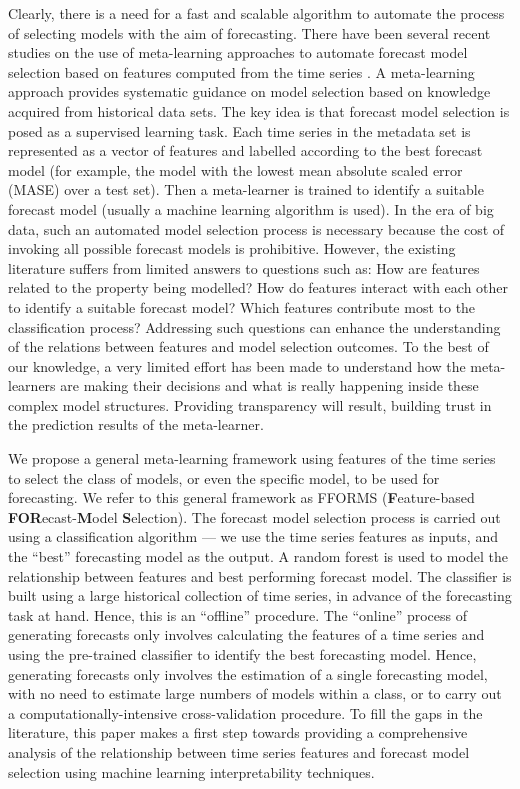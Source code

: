 \documentclass[11pt,a4paper,]{article}
\begin{document}
Clearly, there is a need for a fast and scalable algorithm to automate the process of selecting models with the aim of forecasting.
There have been several recent studies on the use of meta-learning approaches to automate forecast model selection based on features computed from the time series \autocites{shah1997model}{prudencio2004meta}{lemke2010meta}{kuck2016meta}. A meta-learning approach provides systematic guidance on model selection based on knowledge acquired from historical data sets. The key idea is that forecast model selection is posed as a supervised learning task. Each time series in the metadata set is represented as a vector of features and labelled according to the best forecast model (for example, the model with the lowest mean absolute scaled error (MASE) over a test set). Then a meta-learner is trained to identify a suitable forecast model (usually a machine learning algorithm is used). In the era of big data, such an automated model selection process is necessary because the cost of invoking all possible forecast models is prohibitive. However, the existing literature suffers from limited answers to questions such as: How are features related to the property being modelled? How do features interact with each other to identify a suitable forecast model? Which features contribute most to the classification process? Addressing such questions can enhance the understanding of the relations between features and model selection outcomes. To the best of our knowledge, a very limited effort has been made to understand how the meta-learners are making their decisions and what is really happening inside these complex model structures. Providing transparency will result, building trust in the prediction results of the meta-learner.

We propose a general meta-learning framework using features of the time series to select the class of models, or even the specific model, to be used for forecasting. We refer to this general framework as FFORMS (\textbf{F}eature-based \textbf{FOR}ecast-\textbf{M}odel \textbf{S}election). The forecast model selection process is carried out using a classification algorithm --- we use the time series features as inputs, and the ``best'' forecasting model as the output. A random forest is used to model the relationship between features and best performing forecast model. The classifier is built using a large historical collection of time series, in advance of the forecasting task at hand. Hence, this is an ``offline'' procedure. The ``online'' process of generating forecasts only involves calculating the features of a time series and using the pre-trained classifier to identify the best forecasting model. Hence, generating forecasts only involves the estimation of a single forecasting model, with no need to estimate large numbers of models within a class, or to carry out a computationally-intensive cross-validation procedure. To fill the gaps in the literature, this paper makes a first step towards providing a comprehensive analysis of the relationship between time series features and forecast model selection using machine learning interpretability techniques.
\end{document}
